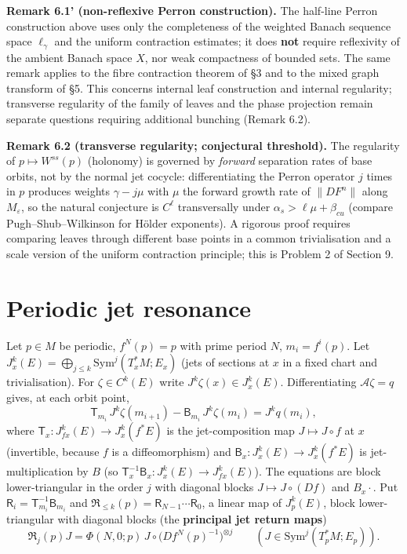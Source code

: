\documentclass[11pt,a4paper]{article}
\theoremstyle{plain}
\theoremstyle{definition}
\theoremstyle{remark}
\numberwithin{equation}{section}
\numberwithin{figure}{section}
\begin{document}
\textbf{Remark 6.1' (non-reflexive Perron construction).} The half-line Perron construction above uses only the completeness of the weighted Banach sequence space $\ell_\gamma$ and the uniform contraction estimates; it does \textbf{not} require reflexivity of the ambient Banach space $X$, nor weak compactness of bounded sets. The same remark applies to the fibre contraction theorem of §3 and to the mixed graph transform of §5. This concerns internal leaf construction and internal regularity; transverse regularity of the family of leaves and the phase projection remain separate questions requiring additional bunching (Remark 6.2).

\textbf{Remark 6.2 (transverse regularity; conjectural threshold).} The regularity of $p\mapsto W^{ss}(p)$ (holonomy) is governed by \textit{forward} separation rates of base orbits, not by the normal jet cocycle: differentiating the Perron operator $j$ times in $p$ produces weights $\gamma-j\mu$ with $\mu$ the forward growth rate of $\|DF^n\|$ along $M_\varepsilon$, so the natural conjecture is $C^\ell$ transversally under $\alpha_s>\ell\mu+\beta_{cu}$ (compare Pugh–Shub–Wilkinson for Hölder exponents). A rigorous proof requires comparing leaves through different base points in a common trivialisation and a scale version of the uniform contraction principle; this is Problem 2 of Section 9.

\section{Periodic jet resonance}

Let $p\in M$ be periodic, $f^N(p)=p$ with prime period $N$, $m_i=f^i(p)$. Let $J^k_x(E)=\bigoplus_{j\le k}\mathrm{Sym}^j(T^*_xM;E_x)$ (jets of sections at $x$ in a fixed chart and trivialisation). For $\zeta\in C^k(E)$ write $J^k\zeta(x)\in J^k_x(E)$. Differentiating $\mathcal A\zeta=q$ gives, at each orbit point,
\[
\mathsf T_{m_i}\,J^k\zeta(m_{i+1})-\mathsf B_{m_i}\,J^k\zeta(m_i)=J^kq(m_i),\tag{7.1}
\]
where $\mathsf T_x:J^k_{fx}(E)\to J^k_x(f^*E)$ is the jet-composition map $J\mapsto J\circ f$ at $x$ (invertible, because $f$ is a diffeomorphism) and $\mathsf B_x:J^k_x(E)\to J^k_x(f^*E)$ is jet-multiplication by $B$ (so $\mathsf T_x^{-1}\mathsf B_x:J^k_x(E)\to J^k_{fx}(E)$). The equations are block lower-triangular in the order $j$ with diagonal blocks $J\mapsto J\circ(Df)$ and $B_x\cdot$. Put $\mathsf R_i=\mathsf T_{m_i}^{-1}\mathsf B_{m_i}$ and $\mathfrak R_{\le k}(p)=\mathsf R_{N-1}\cdots\mathsf R_0$, a linear map of $J^k_p(E)$, block lower-triangular with diagonal blocks (the \textbf{principal jet return maps})
\[
\mathfrak R_j(p)J=\Phi(N,0;p)\,J\circ\big(Df^N(p)^{-1}\big)^{\otimes j}\qquad(J\in\mathrm{Sym}^j(T^*_pM;E_p)).
\]
\end{document}
